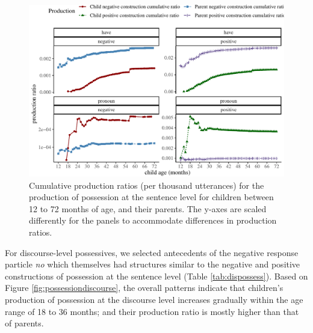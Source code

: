 \documentclass[
  man,floatsintext]{apa6}
\begin{document}
\begin{figure}[H]

{\centering \includegraphics{neg_construction_article_files/figure-latex/possession-1} 

}

\caption{Cumulative production ratios (per thousand utterances) for the production of possession at the sentence level for children between 12 to 72 months of age, and their parents. The y-axes are scaled differently for the panels to accommodate differences in production ratios.}\label{fig:possession}
\end{figure}

For discourse-level possessives, we selected antecedents of the negative response particle \emph{no} which themselves had structures similar to the negative and positive constructions of possession at the sentence level (Table \ref{tab:dispossess}). Based on Figure \ref{fig:possessiondiscourse}, the overall patterns indicate that children's production of possession at the discourse level increases gradually within the age range of 18 to 36 months; and their production ratio is mostly higher than that of parents.
\end{document}
